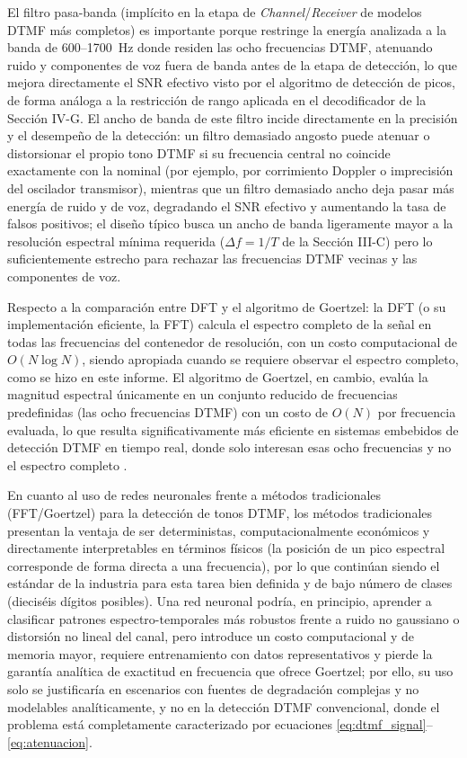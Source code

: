 \documentclass[conference]{IEEEtran}
\begin{document}
El filtro pasa-banda (implícito en la etapa de \textit{Channel}/\textit{Receiver} de modelos DTMF más completos) es importante porque restringe la energía analizada a la banda de 600--1700~Hz donde residen las ocho frecuencias DTMF, atenuando ruido y componentes de voz fuera de banda antes de la etapa de detección, lo que mejora directamente el SNR efectivo visto por el algoritmo de detección de picos, de forma análoga a la restricción de rango aplicada en el decodificador de la Sección IV-G. El ancho de banda de este filtro incide directamente en la precisión y el desempeño de la detección: un filtro demasiado angosto puede atenuar o distorsionar el propio tono DTMF si su frecuencia central no coincide exactamente con la nominal (por ejemplo, por corrimiento Doppler o imprecisión del oscilador transmisor), mientras que un filtro demasiado ancho deja pasar más energía de ruido y de voz, degradando el SNR efectivo y aumentando la tasa de falsos positivos; el diseño típico busca un ancho de banda ligeramente mayor a la resolución espectral mínima requerida ($\Delta f = 1/T$ de la Sección III-C) pero lo suficientemente estrecho para rechazar las frecuencias DTMF vecinas y las componentes de voz.

Respecto a la comparación entre DFT y el algoritmo de Goertzel: la DFT (o su implementación eficiente, la FFT) calcula el espectro completo de la señal en todas las frecuencias del contenedor de resolución, con un costo computacional de $O(N \log N)$, siendo apropiada cuando se requiere observar el espectro completo, como se hizo en este informe. El algoritmo de Goertzel, en cambio, evalúa la magnitud espectral únicamente en un conjunto reducido de frecuencias predefinidas (las ocho frecuencias DTMF) con un costo de $O(N)$ por frecuencia evaluada, lo que resulta significativamente más eficiente en sistemas embebidos de detección DTMF en tiempo real, donde solo interesan esas ocho frecuencias y no el espectro completo \cite{proakis}.

En cuanto al uso de redes neuronales frente a métodos tradicionales (FFT/Goertzel) para la detección de tonos DTMF, los métodos tradicionales presentan la ventaja de ser deterministas, computacionalmente económicos y directamente interpretables en términos físicos (la posición de un pico espectral corresponde de forma directa a una frecuencia), por lo que continúan siendo el estándar de la industria para esta tarea bien definida y de bajo número de clases (dieciséis dígitos posibles). Una red neuronal podría, en principio, aprender a clasificar patrones espectro-temporales más robustos frente a ruido no gaussiano o distorsión no lineal del canal, pero introduce un costo computacional y de memoria mayor, requiere entrenamiento con datos representativos y pierde la garantía analítica de exactitud en frecuencia que ofrece Goertzel; por ello, su uso solo se justificaría en escenarios con fuentes de degradación complejas y no modelables analíticamente, y no en la detección DTMF convencional, donde el problema está completamente caracterizado por ecuaciones \eqref{eq:dtmf_signal}--\eqref{eq:atenuacion}.
\end{document}
